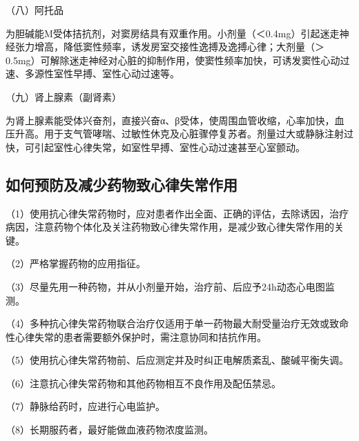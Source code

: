 （八）阿托品

为胆碱能M受体拮抗剂，对窦房结具有双重作用。小剂量（＜0.4mg）引起迷走神经张力增高，降低窦性频率，诱发房室交接性逸搏及逸搏心律；大剂量（＞0.5mg）可解除迷走神经对心脏的抑制作用，使窦性频率加快，可诱发窦性心动过速、多源性室性早搏、室性心动过速等。

（九）肾上腺素（副肾素）

为肾上腺素能受体兴奋剂，直接兴奋α、β受体，使周围血管收缩，心率加快，血压升高。用于支气管哮喘、过敏性休克及心脏骤停复苏者。剂量过大或静脉注射过快，可引起室性心律失常，如室性早搏、室性心动过速甚至心室颤动。

\protect\hypertarget{text00054.htmlux5cux23subid656}{}{}

\subsection{如何预防及减少药物致心律失常作用}

（1）使用抗心律失常药物时，应对患者作出全面、正确的评估，去除诱因，治疗病因，注意药物个体化及关注药物致心律失常作用，是减少致心律失常作用的关键。

（2）严格掌握药物的应用指征。

（3）尽量先用一种药物，并从小剂量开始，治疗前、后应予24h动态心电图监测。

（4）多种抗心律失常药物联合治疗仅适用于单一药物最大耐受量治疗无效或致命性心律失常的患者需要额外保护时，需注意协同和拮抗作用。

（5）使用抗心律失常药物前、后应测定并及时纠正电解质紊乱、酸碱平衡失调。

（6）注意抗心律失常药物和其他药物相互不良作用及配伍禁忌。

（7）静脉给药时，应进行心电监护。

（8）长期服药者，最好能做血液药物浓度监测。

\protect\hypertarget{text00055.html}{}{}

\protect\hypertarget{text00055.htmlux5cux23chapter55}{}{}

